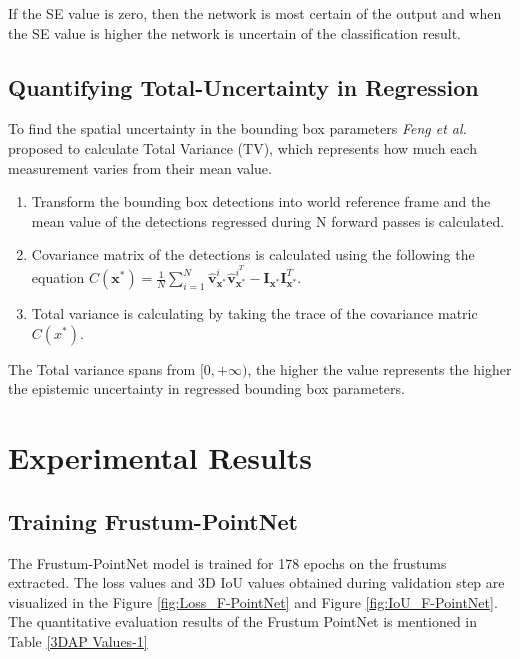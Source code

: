 \documentclass[10pt,twocolumn,letterpaper]{article}
\begin{document}
        If the SE value is zero, then the network is most certain of the output and when the SE value is higher the network is uncertain of the classification result.
        
         \subsection{Quantifying Total-Uncertainty in Regression}
         \label{uncertainty in bounding box regression}
         To find the spatial uncertainty in the bounding box parameters \textit{Feng et al.} \cite{Feng2018} proposed to calculate Total Variance (TV), which represents how much each measurement varies from their mean value.
         
         \begin{enumerate}
             \item Transform the bounding box detections into world reference frame and the mean value of the detections regressed during N forward passes is calculated.
             \item Covariance matrix of the detections is calculated using the following the equation $C\left(\mathbf{x}^{*}\right)=\frac{1}{N} \sum_{i=1}^{N} \hat{\mathbf{v}}_{\mathbf{x}^{*}}^{i} \hat{\mathbf{v}}_{\mathbf{x}^{*}}^{i^{T}}-\mathbf{I}_{\mathbf{x}^{*}} \mathbf{I}_{\mathbf{x}^{*}}^{T}$.
             \item Total variance is calculating by taking the trace of the covariance matric $C(x^{*})$.
         \end{enumerate}
         
         The Total variance spans from $[0,+\infty)$, the higher the value represents the higher the epistemic uncertainty in regressed bounding box parameters.
\section{Experimental Results}
\subsection{Training Frustum-PointNet }
The Frustum-PointNet model is trained for 178 epochs on the frustums extracted. The loss values and 3D IoU values obtained during validation step are visualized in the Figure \ref{fig:Loss_F-PointNet} and Figure \ref{fig:IoU_F-PointNet}. The quantitative evaluation results of the Frustum PointNet is mentioned in Table \ref{3DAP Values-1}
\end{document}
